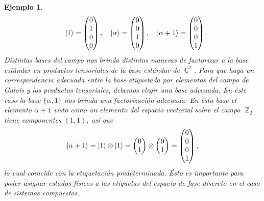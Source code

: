 \documentclass[a4paper]{report}
\DeclareMathOperator{\C}{\mathbb{C}}
\DeclareMathOperator{\Z}{\mathbb{Z}}
\newtheorem{example}{Ejemplo}
\begin{document}
\begin{example}
\[      \quad
      \ket{1}
      = \begin{pmatrix} 0\\1\\0\\0 \end{pmatrix},
      \quad
      \ket{\alpha}
      = \begin{pmatrix} 0\\0\\1\\0 \end{pmatrix},
      \quad
      \ket{\alpha+1}
      = \begin{pmatrix} 0\\0\\0\\1 \end{pmatrix}. 
    \] 
    Distintas bases del campo nos brinda distintas maneras
    de factorizar a la base estándar en productos
    tensoriales de la base estándar de $\C^2$. Para que haya
    un correspondencia adecuada entre la base etiquetada por
    elementos del campo de Galois y los productos
    tensoriales, debemos elegir una base adecuada.  En éste
    caso la base $\{\alpha, 1\}$ nos brinda una factorización
    adecuada. En
    ésta base el elemento $\alpha + 1$ visto como un
    elemento del espacio vectorial sobre el campo $\Z_2$
    tiene componentes $(1,1)$, así que 
    \[
      \ket{\alpha + 1}
      = \ket{1} \otimes \ket{1}
      = \begin{pmatrix} 0\\1 \end{pmatrix} 
      \otimes
      \begin{pmatrix} 0\\1 \end{pmatrix} 
      = \begin{pmatrix} 0\\0\\0\\1 \end{pmatrix},
    \] 
    lo cual coincide con la etiquetación predeterminada.
    Ésto es importante para poder asignar estados físicos a
    las etiquetas del espacio de fase discreto en el caso de
    sistemas compuestos.


\end{example}
\end{document}
